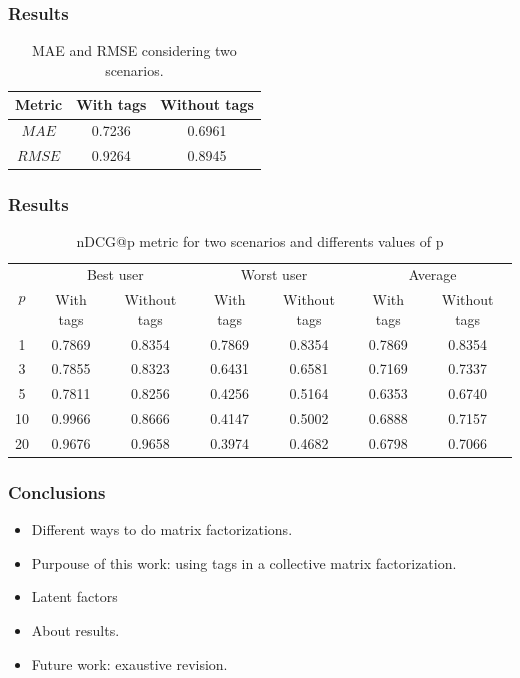 \documentclass[aspectratio=169,handout]{beamer}
\begin{document}
\begin{frame}
\frametitle{Results}
\begin{table}[!htb]
\caption{MAE and RMSE considering two scenarios.}
\centering
\begin{tabular}{|c|c|c|}
\hline
Metric & With tags & Without tags\\ \hline \hline
$MAE$ & 0.7236 & 0.6961\\ \hline
$RMSE$ & 0.9264 & 0.8945\\
\hline
\end{tabular}
\label{tab:metric1}
\end{table}
\end{frame}

\begin{frame}
\frametitle{Results}
\begin{table}
\centering
\caption{nDCG@p metric for two scenarios and differents values of p}
\begin{tabular}{|c|c|c|c|c|c|c|}
\hline
\multirow{2}{*}{$p$} & \multicolumn{2}{|c|}{Best user} & \multicolumn{2}{|c|}{Worst user} & \multicolumn{2}{|c|}{Average} \\ \cline{2-7}
 & With tags & Without tags & With tags & Without tags & With tags & Without tags \\ \hline \hline
1 & 0.7869 & 0.8354 & 0.7869 & 0.8354 & 0.7869 & 0.8354 \\ \hline
3 & 0.7855 & 0.8323 & 0.6431 & 0.6581 & 0.7169 & 0.7337\\ \hline
5 & 0.7811 & 0.8256 & 0.4256 & 0.5164 & 0.6353 & 0.6740\\ \hline
10 & 0.9966 & 0.8666 & 0.4147 & 0.5002 & 0.6888 & 0.7157\\ \hline
20 & 0.9676 & 0.9658 & 0.3974 & 0.4682 & 0.6798 & 0.7066\\ \hline
\end{tabular}
\label{tab:ndcg}
\end{table}
\end{frame}

\begin{frame}
\frametitle{Conclusions}
\begin{itemize}
\item Different ways to do matrix factorizations.
\pause
\item Purpouse of this work: \pause using tags in a collective matrix factorization.
\pause
\item Latent factors
\pause
\item About results.
\pause
\item Future work: exaustive revision.
\end{itemize}
\end{frame}
\end{document}
